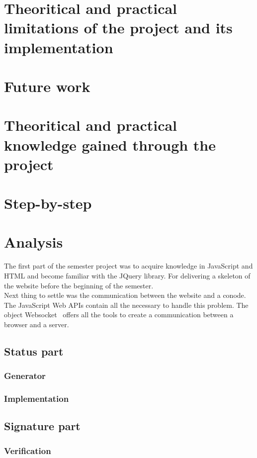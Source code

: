 \documentclass[11pt, a4paper, twoside, openright, openany]{book} %
\begin{document}
\chapter{Theoritical and practical limitations of the project and its implementation}
\chapter{Future work}
\chapter{Theoritical and practical knowledge gained through the project}
\chapter{Step-by-step}

\chapter{Analysis}
The first part of the semester project was to acquire knowledge in JavaScript and
HTML and become familiar with the JQuery library. For delivering a skeleton of
the website before the beginning of the semester.\\
Next thing to settle was the communication between the website and a conode.
The JavaScript Web APIs contain all the necessary to handle this problem.
The object Websocket~\cite{websocketPage} offers all the tools to create a
communication between a browser and a server.\\

\section{Status part}
\subsection{Generator}

\subsection{Implementation}

\section{Signature part}


\subsection{Verification}

\fi



\begingroup
\let\cleardoublepage\clearpage


\endgroup
\end{document}
